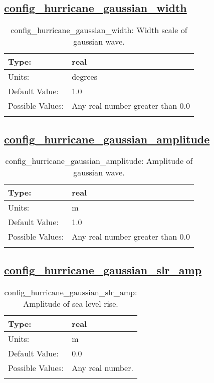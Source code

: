 \subsection[config\_hurricane\_gaussian\_width]{\hyperref[sec:nm_tab_hurricane]{config\_hurricane\_gaussian\_width}}
\label{subsec:nm_sec_config_hurricane_gaussian_width}
\begin{center}
\begin{longtable}{| p{2.0in} || p{4.0in} |}
    \hline
    Type: & real \\
    \hline
    Units: & \si{degrees} \\
    \hline
    Default Value: & 1.0 \\
    \hline
    Possible Values: & Any real number greater than 0.0 \\
    \hline
    \caption{config\_hurricane\_gaussian\_width: Width scale of gaussian wave.}
\end{longtable}
\end{center}
\subsection[config\_hurricane\_gaussian\_amplitude]{\hyperref[sec:nm_tab_hurricane]{config\_hurricane\_gaussian\_amplitude}}
\label{subsec:nm_sec_config_hurricane_gaussian_amplitude}
\begin{center}
\begin{longtable}{| p{2.0in} || p{4.0in} |}
    \hline
    Type: & real \\
    \hline
    Units: & \si{m} \\
    \hline
    Default Value: & 1.0 \\
    \hline
    Possible Values: & Any real number greater than 0.0 \\
    \hline
    \caption{config\_hurricane\_gaussian\_amplitude: Amplitude of gaussian wave.}
\end{longtable}
\end{center}
\subsection[config\_hurricane\_gaussian\_slr\_amp]{\hyperref[sec:nm_tab_hurricane]{config\_hurricane\_gaussian\_slr\_amp}}
\label{subsec:nm_sec_config_hurricane_gaussian_slr_amp}
\begin{center}
\begin{longtable}{| p{2.0in} || p{4.0in} |}
    \hline
    Type: & real \\
    \hline
    Units: & \si{m} \\
    \hline
    Default Value: & 0.0 \\
    \hline
    Possible Values: & Any real number. \\
    \hline
    \caption{config\_hurricane\_gaussian\_slr\_amp: Amplitude of sea level rise.}
\end{longtable}
\end{center}
